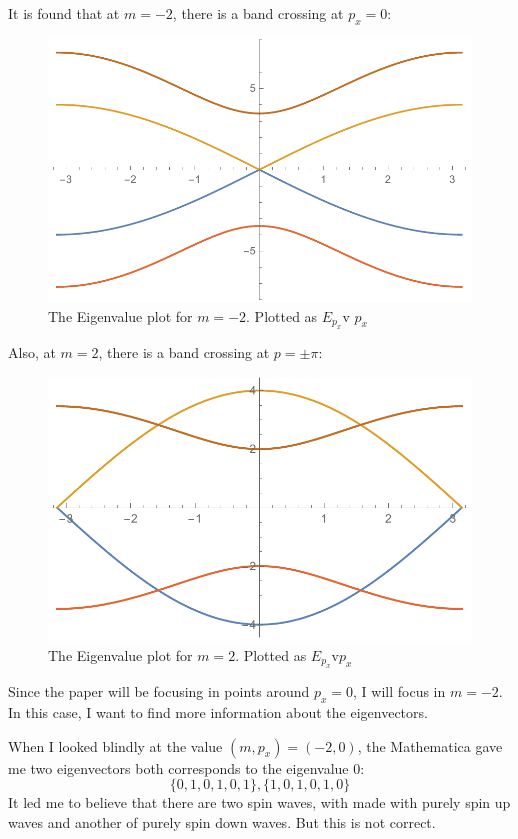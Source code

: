 \documentclass{article}
\begin{document}
    It is found that at $m=-2$, there is a band crossing at $p_x=0$:
    \begin{figure}[H]
        \centering
        \includegraphics[width=0.6\linewidth]{pics/N6m-2.pdf}
        \caption{The Eigenvalue plot for $m=-2$. Plotted as
        $E_{p_x}$v $p_x$ }
    \end{figure}

    Also, at $m=2$, there is a band crossing at $p=\pm\pi$:
    \begin{figure}[H]
        \centering
        \includegraphics[width=0.6\linewidth]{pics/N6m2.pdf}
        \caption{The Eigenvalue plot for $m=2$. Plotted as
        $E_{p_x}$v$p_x$ }
    \end{figure}

    Since the paper will be focusing in points around $p_x=0$, I will
    focus in $m=-2$. In this case, I want to find more information
    about the eigenvectors. 
    
    When I looked blindly at the value $(m,p_x)=(-2,0)$, the
    Mathematica gave me two eigenvectors both corresponds to the
    eigenvalue $0$:
    \begin{equation}
        \{0,1,0,1,0,1\},\{1,0,1,0,1,0\}
    \end{equation}
    It led me to believe that there are two spin waves, with made with
    purely spin up waves and another of purely spin down waves. But
    this is not correct. 
\end{document}
